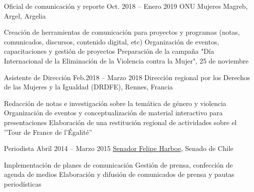 \begin{joblist}
\item[Oficial de comunicación y reporte]{Oct. 2018 -- Enero 2019 }     
	{
	ONU Mujeres Magreb, Argel, Argelia
	}     
	{
		\normalsize{
		\vspace{-0.5cm}
		\begin{itemize}
			  \iftbftiny \setlength\itemsep{-3pt} \fi
			  \cvitem[\checkmark] Creación de herramientas de comunicación para proyectos y programas (notas, comunicados, discursos, contenido digital, etc)
 			  \cvitem[\checkmark] Organización de eventos, capacitaciones y gestión de proyectos                                          
			  \cvitem[\checkmark] Preparación de la campaña "Día Internacional de la Eliminación de la Violencia contra la Mujer", 25 de noviembre
		\end{itemize}      
        }
	}


\item[Asistente de Dirección]{Feb.2018 -- Marzo 2018 }     
	{
	\tbflogo{../Figure/logo/drdfe_128.png}
	Dirección regional por los Derechos de las Mujeres y la Igualdad (DRDFE), Rennes, Francia
	}     
	{
		\normalsize{            		
		\iftbftiny \vspace{-0.5cm} \fi
		\begin{itemize}
			  \iftbftiny \setlength\itemsep{-3pt} \fi
			  \cvitem[\checkmark] Redacción de notas e investigación sobre la temática de género y violencia
			  \cvitem[\checkmark] Organización de eventos y conceptualización de material interactivo para presentaciones 
			  \cvitem[\checkmark] Elaboración de una restitución regional de actividades sobre el ''Tour de France de l'Égalité''
		\end{itemize}      
        }
	}



\item[Periodista ]{Abril 2014 -- Marzo 2015}
     {
     \href{https://www.harboe.cl/}{Senador Felipe Harboe}, Senado de Chile
     } 
	 {
		\normalsize{
		\iftbftiny \vspace{-0.5cm} \fi
			\begin{itemize}
			  \iftbftiny \setlength\itemsep{-3pt} \fi
			  \cvitem[\checkmark] Implementación de planes de comunicación
			  \cvitem[\checkmark] Gestión de prensa, confección de agenda de medios
			  \cvitem[\checkmark] Elaboración y difusión de comunicados de prensa y pautas periodísticas
			  

\end{itemize}}}
\end{joblist}
